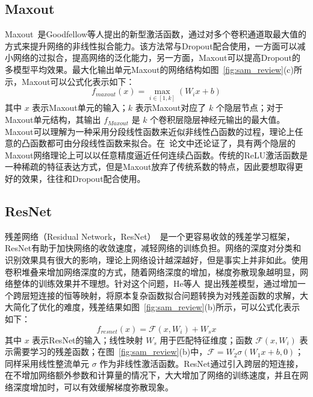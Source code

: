 \subsection{Maxout}
\label{sec:sap:review:maxout}

Maxout~\cite{goodfellow2013maxout}是Goodfellow等人提出的新型激活函数，通过对多个卷积通道取最大值的方式来提升网络的非线性拟合能力。该方法常与Dropout配合使用，一方面可以减小网络的过拟合，提高网络的泛化能力，另一方面，Maxout可以提高Dropout的多模型平均效果。最大化输出单元Maxout的网络结构如图~\ref{fig:sam_review}(c)所示，Maxout可以公式化表示如下：
\begin{equation} \label{equ:maxout}
f_{maxout}(x)=\max\limits_{i\in[1,k]}(W_{i}x+b)
\end{equation}
其中 $x$ 表示Maxout单元的输入；$k$ 表示Maxout对应了 $k$ 个隐层节点；对于Maxout单元结构，其输出 $f_{Maxout}$ 是 $k$ 个卷积层隐层神经元输出的最大值。Maxout可以理解为一种采用分段线性函数来近似非线性凸函数的过程，理论上任意的凸函数都可由分段线性函数来拟合。在~\cite{goodfellow2013maxout}论文中还论证了，具有两个隐层的Maxout网络理论上可以以任意精度逼近任何连续凸函数。传统的ReLU激活函数是一种稀疏的特征表达方式，但是Maxout放弃了传统系数的特点，因此要想取得更好的效果，往往和Dropout配合使用。


\subsection{ResNet}
\label{sec:sap:review:resnet}

残差网络（Residual Network，ResNet）~\cite{he2015deep}是一个更容易收敛的残差学习框架，ResNet有助于加快网络的收敛速度，减轻网络的训练负担。网络的深度对分类和识别效果具有很大的影响，理论上网络设计越深越好，但是事实上并非如此。使用卷积堆叠来增加网络深度的方式，随着网络深度的增加，梯度弥散现象越明显，网络整体的训练效果并不理想。针对这个问题，He等人~\cite{he2015deep}提出残差模型，通过增加一个跨层短连接的恒等映射，将原本复杂函数拟合问题转换为对残差函数的求解，大大简化了优化的难度，残差结果如图~\ref{fig:sam_review}(b)所示，可以公式化表示如下：
\begin{equation} \label{equ:resnet}
f_{resnet}(x)=\mathcal{F}(x, W_i) + W_{s}x
\end{equation}
其中 $x$ 表示ResNet的输入；线性映射 $W_s$ 用于匹配特征维度；函数 $\mathcal{F}(x, W_i)$ 表示需要学习的残差函数；在图~\ref{fig:sam_review}(b)中，$\mathcal{F} = W_{2}\sigma(W_{1}x+b, 0)$；同样采用线性整流单元 $\sigma$ 作为非线性激活函数。ResNet通过引入跨层的短连接，在不增加网络额外参数和计算量的情况下，大大增加了网络的训练速度，并且在网络深度增加时，可以有效缓解梯度弥散现象。


